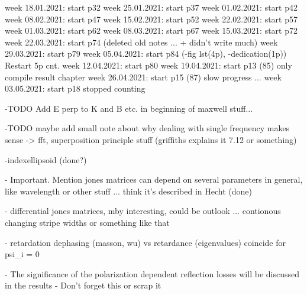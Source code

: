 week 18.01.2021: start p32
week 25.01.2021: start p37
week 01.02.2021: start p42
week 08.02.2021: start p47
week 15.02.2021: start p52
week 22.02.2021: start p57
week 01.03.2021: start p62
week 08.03.2021: start p67
week 15.03.2021: start p72
week 22.03.2021: start p74 (deleted old notes ... + didn't write much)
week 29.03.2021: start p79
week 05.04.2021: start p84 (-fig lst(4p), -dedication(1p)) Restart 5p cnt. 
week 12.04.2021: start p80
week 19.04.2021: start p13 (85) only compile result chapter
week 26.04.2021: start p15 (87) slow progress ...
week 03.05.2021: start p18
stopped counting


-TODO Add E perp to K and B etc. in beginning of maxwell stuff...

-TODO maybe add small note about why dealing with single frequency makes sense -> fft, superposition principle stuff (griffiths explains it 7.12 or something)

-indexellipsoid (done?)

- Important. Mention jones matrices can depend on several parameters in general, like wavelength or other stuff ... think it's described in Hecht (done)

- differential jones matrices, mby interesting, could be outlook ... contionous changing stripe widths or something like that

- retardation dephasing (masson, wu) vs retardance (eigenvalues) coincide for psi_i = 0

- The significance of the polarization dependent reflection losses will be discussed in the results
    - Don't forget this or scrap it
    

